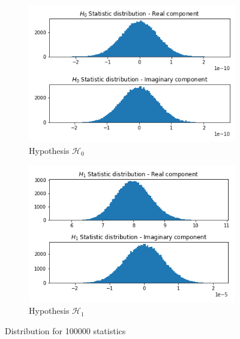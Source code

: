 \documentclass[a4 paper]{article}
\begin{document}
\vspace{-1em}
\begin{figure}[h]
	\centering
	\begin{subfigure}{.5\textwidth}
		\includegraphics[width=1\linewidth]{../results/cyclostationary_detector_a_H0_ideal.png}
		\caption{Hypothesis $\mathcal{H}_{0}$}
		\label{fig:cyclo_ai1}
	\end{subfigure}%
	\begin{subfigure}{.5\textwidth}
		\includegraphics[width=1\linewidth]{../results/cyclostationary_detector_a_H1_ideal.png}
		\caption{Hypothesis $\mathcal{H}_{1}$}
		\label{fig:cyclo_ai2}
	\end{subfigure}
	\caption{Distribution for 100000 statistics}
	\label{fig:cyclo_ai}
\end{figure}


\vspace{-1em}
\vspace{-1em}
\end{document}
